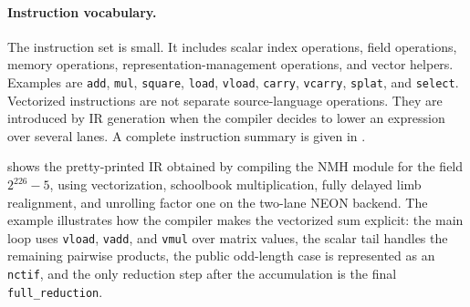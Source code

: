 \paragraph{Instruction vocabulary.}
The instruction set is small. It includes scalar index operations, field operations, memory operations, representation-management operations, and vector helpers. Examples are \texttt{add}, \texttt{mul}, \texttt{square}, \texttt{load}, \texttt{vload}, \texttt{carry}, \texttt{vcarry}, \texttt{splat}, and \texttt{select}. Vectorized instructions are not separate source-language operations. They are introduced by IR generation when the compiler decides to lower an expression over several lanes. A complete instruction summary is given in .

 shows the pretty-printed IR obtained by compiling the NMH module for the field \(2^{226}-5\), using vectorization, schoolbook multiplication, fully delayed limb realignment, and unrolling factor one on the two-lane NEON backend. The example illustrates how the compiler makes the vectorized sum explicit: the main loop uses \texttt{vload}, \texttt{vadd}, and \texttt{vmul} over matrix values, the scalar tail handles the remaining pairwise products, the public odd-length case is represented as an \texttt{nctif}, and the only reduction step after the accumulation is the final \texttt{full\_reduction}.

